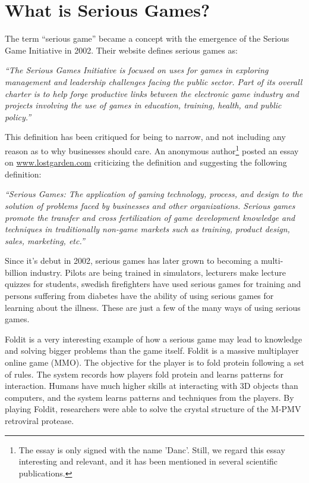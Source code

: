 \section{What is Serious Games?}

The term ``serious game'' became a concept with the emergence of the Serious Game Initiative in 2002\cite{seriousgamesinitative}. Their website defines serious games as: 

\textit{``The Serious Games Initiative is focused on uses for games in exploring management and leadership challenges facing the public sector. Part of its overall charter is to help forge productive links between the electronic game industry and projects involving the use of games in education, training, health, and public policy.''} 

This definition has been critiqued for being to narrow, and not including any reason as to why businesses should care. An anonymous author\footnote{The essay is only signed with the name 'Danc'. Still, we regard this essay interesting and relevant, and it has been mentioned in several scientific publications.} posted an essay on \url{www.lostgarden.com} criticizing the definition and suggesting the following definition:

\textit{``Serious Games: The application of gaming technology, process, and design to the solution of problems faced by businesses and other organizations. Serious games promote the transfer and cross fertilization of game development knowledge and techniques in traditionally non-game markets such as training, product design, sales, marketing, etc.''}


Since it's debut in 2002, serious games has later grown to becoming a multi-billion industry.
Pilots are being trained in simulators, lecturers make lecture quizzes for students\cite{wang2007lecture}, swedish firefighters have used serious games for training\cite{lebram2009design} and persons suffering from diabetes have the ability of using serious games for learning about the illness. These are just a few of the many ways of using serious games. 

Foldit is a very interesting example of how a serious game may lead to knowledge and solving bigger problems than the game itself\cite{cooper2010predicting}. Foldit is a massive multiplayer online game (MMO). The objective for the player is to fold protein following a set of rules. The system records how players fold protein and learns patterns for interaction. Humans have much higher skills at interacting with 3D objects than computers, and the system learns patterns and techniques from the players. By playing Foldit, researchers were able to solve the crystal structure of the M-PMV retroviral protease\cite{khatib2011crystal}.

